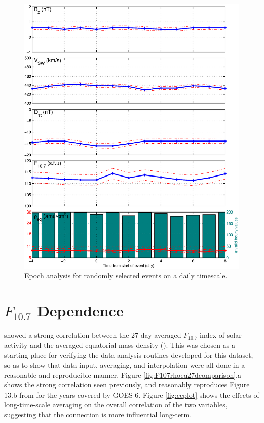 \begin{figure}[htp!]
	\centering
	\includegraphics[width=1\linewidth]{Figures/StormAvs/stormavs-randomdaily-GOES6}
	\caption{Epoch analysis for randomly selected events on a daily timescale.}
	\label{fig:EpochRandomDaily}
\end{figure}



\section{$F_{10.7}$ Dependence}
\cite{Takahashi2010SolarCycleVariation} showed a strong correlation between the 27-day averaged $F_{10.7}$ index of solar activity and the averaged equatorial mass density (\req). This was chosen as a starting place for verifying the data analysis routines developed for this dataset, so as to show that data input, averaging, and interpolation were all done in a reasonable and reproducible manner. Figure \ref{fig:F107rhoeq27dcomparison}.a shows the strong correlation seen previously, and reasonably reproduces Figure 13.b from \cite{Takahashi2010SolarCycleVariation} for the years covered by GOES 6. Figure \ref{fig:ccplot} shows the effects of long-time-scale averaging on the overall correlation of the two variables, suggesting that the connection is more influential long-term.

